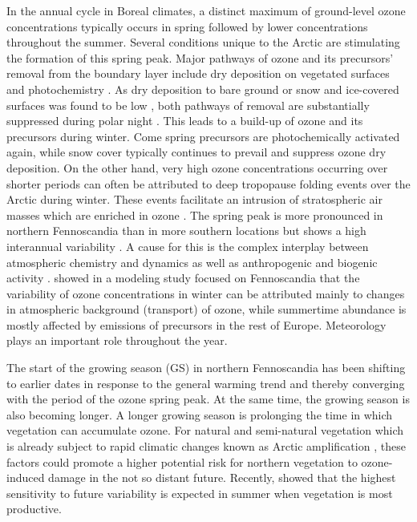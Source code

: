\documentclass[bg, manuscript]{copernicus}
\begin{document}
In the annual cycle in Boreal climates, a distinct maximum of ground-level ozone concentrations typically occurs in spring followed by lower concentrations throughout the summer. Several conditions unique to the Arctic are stimulating the formation of this spring peak. Major pathways of ozone and its precursors' removal from the boundary layer include dry deposition on vegetated surfaces and photochemistry \citep{RG:Clifton2020}. As dry deposition to bare ground or snow and ice-covered surfaces was found to be low \citep{ACP:Helmig2007}, both pathways of removal are substantially suppressed during polar night \citep{AE:Monks2000}. This leads to a build-up of ozone and its precursors during winter. Come spring precursors are photochemically activated again, while snow cover typically continues to prevail and suppress ozone dry deposition.
On the other hand, very high ozone concentrations occurring over shorter periods can often be attributed to deep tropopause folding events over the Arctic during winter. These events facilitate an intrusion of stratospheric air masses which are enriched in ozone \citep{JGR:Skerlak2015}.
The spring peak is more pronounced in northern Fennoscandia than in more southern locations but shows a high interannual variability \citep{AB:Klingberg2009, BER:Klingberg2019}. A cause for this is the complex interplay between atmospheric chemistry and dynamics \citep{AE:Laurila1996,BER:Hatakka2003} as well as anthropogenic and biogenic activity \citep{AE:Rummukainen1996,AE:Simpson2002,QJRMS:Galbally2007,NGS:Schnell2009}. \citet{ACP:Andersson2017} showed in a modeling study focused on Fennoscandia that the variability of ozone concentrations in winter can be attributed mainly to changes in atmospheric background (transport) of ozone, while summertime abundance is mostly affected by emissions of precursors in the rest of Europe. Meteorology plays an important role throughout the year.

The start of the growing season (GS) in northern Fennoscandia has been shifting to earlier dates in response to the general warming trend \citep[e.g.]{GCB:Menzel2006,RS:Hogda2013,IJB:Karlsen2007} and thereby converging with the period of the ozone spring peak. At the same time, the growing season is also becoming longer. A longer growing season is prolonging the time in which vegetation can accumulate ozone. For natural and semi-natural vegetation which is already subject to rapid climatic changes known as Arctic amplification \citep{AMAP2012,IPCC2013}, these factors could promote a higher potential risk for northern vegetation to ozone-induced damage in the not so distant future. Recently, \citet{ESPR:Hayes2021} showed that the highest sensitivity to future \chem{[O_3]} variability is expected in summer when vegetation is most productive.
\end{document}
